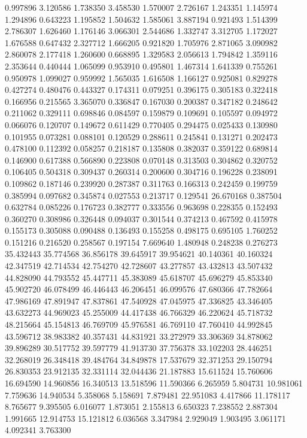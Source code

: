 0.997896
3.120586
1.738350
3.458530
1.570007
2.726167
1.243351
1.145974
1.294896
0.643223
1.195852
1.504632
1.585061
3.887194
0.921493
1.514399
2.786307
1.626460
1.176146
3.066301
2.544686
1.332747
3.312705
1.172027
1.676588
0.647432
2.327712
1.666205
0.921820
1.705976
2.871065
3.090982
2.860078
2.177418
1.260600
0.668895
1.329583
2.056613
1.794842
1.359116
2.353644
0.440444
1.065099
0.953910
0.495801
1.467314
1.641339
0.755261
0.950978
1.099027
0.959992
1.565035
1.616508
1.166127
0.925081
0.829278
0.427274
0.480476
0.443327
0.174311
0.079251
0.396175
0.305183
0.322418
0.166956
0.215565
3.365070
0.336847
0.167030
0.200387
0.347182
0.248642
0.211062
0.329111
0.698846
0.084597
0.159879
0.109691
0.105597
0.094972
0.066076
0.120707
0.149672
0.611429
0.770405
0.294475
0.025433
0.130980
0.101955
0.073281
0.088101
0.120529
0.288611
0.245841
0.131271
0.202473
0.478100
0.112392
0.058257
0.218187
0.135808
0.382037
0.359122
0.689814
0.146900
0.617388
0.566890
0.223808
0.070148
0.313503
0.304862
0.320752
0.106405
0.504318
0.309437
0.260314
0.200600
0.304716
0.196228
0.238091
0.109862
0.187146
0.239920
0.287387
0.311763
0.166313
0.242459
0.199759
0.385994
0.097682
0.345874
0.027553
0.213717
0.129541
26.670168
0.387504
0.632784
0.085226
0.176723
0.382777
0.333556
0.963698
0.228355
0.152493
0.360270
0.308986
0.326448
0.094037
0.301544
0.374213
0.467592
0.415978
0.155173
0.305088
0.090488
0.136493
0.155258
0.498175
0.695105
1.760252
0.151216
0.216520
0.258567
0.197154
7.669640
1.480948
0.248238
0.276273
35.432443
35.774568
36.856178
39.645917
39.954621
40.140361
40.160324
42.347519
42.714534
42.754270
42.728607
43.277857
43.432813
43.507432
44.828090
44.793552
45.447711
45.383089
45.618707
45.696279
45.853340
45.902720
46.078499
46.446443
46.206451
46.099576
47.680366
47.782664
47.986169
47.891947
47.837861
47.540928
47.045975
47.336825
43.346405
43.632273
44.969023
45.255009
44.417438
46.766329
46.220624
45.718732
48.215664
45.154813
46.769709
45.976581
46.769110
47.760410
44.992845
43.596712
38.983382
40.357431
44.831921
33.272979
33.306369
34.878062
39.896289
30.517752
39.597779
41.913730
37.756378
33.102203
28.446251
32.268019
26.348418
39.484764
34.849878
17.537679
32.371253
29.150794
26.830353
23.912135
32.331114
32.044436
21.187883
15.611524
15.760606
16.694590
14.960856
16.340513
13.518596
11.590366
6.265959
5.804731
10.981061
7.759636
14.940534
5.358068
5.158691
7.879481
22.951083
4.417866
11.178117
8.765677
9.395505
6.016077
1.873051
2.155813
6.650323
7.238552
2.887304
1.991665
12.914753
15.121812
6.036568
3.347984
2.929049
1.903495
3.061171
4.092341
3.763300
